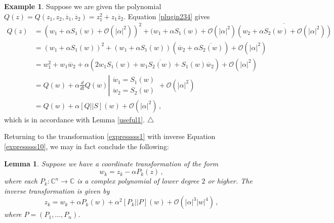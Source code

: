 \documentclass[12pt]{article}
\renewcommand{\mathcal}{\mathscr}
\theoremstyle{plain}
\newtheorem{lem}[thr]{Lemma}
\theoremstyle{definition}
\newtheorem{ex}[thr]{Example}
\theoremstyle{remark}
\theoremstyle{remark}
\begin{document}
\begin{ex}
Suppose we are given the polynomial $Q(z) = Q(z_1, z_2, \overline{z}_1, \overline{z}_2) = z_1^2 + z_1\overline{z}_2$. Equation \eqref{plugin234} gives
\begin{align}
 Q(z) &=    (w_1 + \alpha S_1(w) + \mathcal{O}(|\alpha|^2))^2 + (w_1 + \alpha S_1(w) + \mathcal{O}(|\alpha|^2)\overline{(w_2 + \alpha S_2(w) + \mathcal{O}(|\alpha|^2))} \\ \nonumber
 &=    (w_1 + \alpha S_1(w))^2 + (w_1 + \alpha S_1(w))(\overline{w}_2 + \alpha \overline{S_2(w)}) + \mathcal{O}(|\alpha|^2) \\ \nonumber
 &= w_1^2 + w_1\overline{w}_2 + \alpha(2w_1S_1(w) + w_1\overline{S_2(w)} + S_1(w)\overline{w}_2) + \mathcal{O}(|\alpha|^2) \\ \nonumber
 &= Q(w) + \alpha \frac{d}{dt} Q(w)\left|{\begin{array}{l}
  \dot{w}_1 =   S_1(w) \\
  \dot{w}_2 =   S_2(w) 
\end{array}}\right. + \mathcal{O}(|\alpha|^2) \\ \nonumber
 &= Q(w) + \alpha[Q||S](w) + \mathcal{O}(|\alpha|^2)\,  ,
\end{align}
which is in accordance with Lemma \ref{useful1}. \hfill $\triangle$
\end{ex}
\noindent Returning to the transformation \eqref{expresssss1} with inverse Equation \eqref{expresssss10}, we may in fact conclude the following:
\begin{lem}\label{fullinverse0}
Suppose we have a coordinate transformation of the form
\begin{equation}\label{expresssss01}
w_k = z_k - \alpha P_k(z) \, ,
\end{equation}
where each $P_k: \mathbb{C}^n \rightarrow \mathbb{C}$ is a complex polynomial of lower degree $2$ or higher. The inverse transformation is given by
\begin{equation}\label{expresssss122}
z_k = w_k + \alpha P_k(w) + \alpha^2 [P_k||P](w) + \mathcal{O}(|\alpha|^3|w|^4)\, ,
\end{equation}
where $P = (P_1, \dots, P_n)$.
\end{lem}
\end{document}
